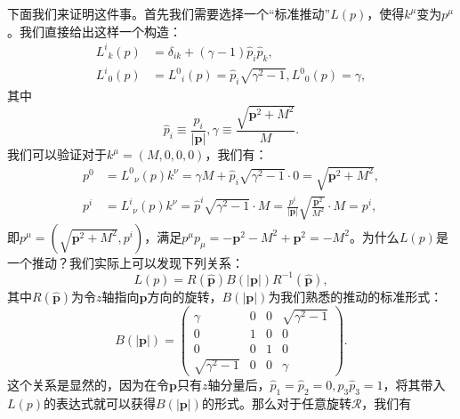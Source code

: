 下面我们来证明这件事。首先我们需要选择一个“标准推动”$ L( p)$，使得$ k^{\mu }$变为$ p^{\mu }$。我们直接给出这样一个构造：
\begin{equation}
	\begin{aligned}
		L^{i}{}_{k}( p) & =\delta _{ik} +( \gamma -1)\hat{p}_{i}\hat{p}_{k} ,\\
		L^{i}{}_{0}( p) & =L^{0}{}_{i}( p) =\hat{p}_{i}\sqrt{\gamma ^{2} -1} ,L^{0}{}_{0}( p) =\gamma ,
		\label{eq:standard_boost}
	\end{aligned}
\end{equation}
其中
\begin{equation*}
	\hat{p}_{i} \equiv \frac{p_{i}}{| \boldsymbol{p}| } ,\gamma \equiv \frac{\sqrt{\boldsymbol{p}^{2} +M^{2}}}{M} .
\end{equation*}
我们可以验证对于$ k^{\mu } =( M,0,0,0)$，我们有：
\begin{equation*}
	\begin{aligned}
		p^{0} & =L^{0}{}_{\nu }( p) k^{\nu } =\gamma M+\hat{p}_{i}\sqrt{\gamma ^{2} -1} \cdot 0=\sqrt{\boldsymbol{p}^{2} +M^{2}} ,\\
		p^{i} & =L^{i}{}_{\nu }( p) k^{\nu } =\hat{p}^{i}\sqrt{\gamma ^{2} -1} \cdot M=\frac{p^{i}}{| \boldsymbol{p}| }\sqrt{\frac{\boldsymbol{p}^{2}}{M^{2}}} \cdot M=p^{i} ,
	\end{aligned}
\end{equation*}
即$ p^{\mu } =(\sqrt{\boldsymbol{p}^{2} +M^{2}} ,p^{i} )$，满足$ p^{\mu } p_{\mu } =-\boldsymbol{p}^{2} -M^{2} +\boldsymbol{p}^{2} =-M^{2}$。为什么$ L( p)$是一个推动？我们实际上可以发现下列关系：
\begin{equation}
	L( p) =R(\hat{\boldsymbol{p}}) B(| \boldsymbol{p}| ) R^{-1}(\hat{\boldsymbol{p}}) ,
	\label{eq:massiveLp}
\end{equation}
其中$ R(\hat{\boldsymbol{p}})$为令$ z$轴指向$ \boldsymbol{p}$方向的旋转，$ B(| \boldsymbol{p}| )$为我们熟悉的推动的标准形式：
\begin{equation*}
	B(| \boldsymbol{p}| ) =\begin{pmatrix}
		\gamma  & 0 & 0 & \sqrt{\gamma ^{2} -1}\\
		0 & 1 & 0 & 0\\
		0 & 0 & 1 & 0\\
		\sqrt{\gamma ^{2} -1} & 0 & 0 & \gamma 
	\end{pmatrix} .
\end{equation*}
这个关系是显然的，因为在令$\boldsymbol{p}$只有$z$轴分量后，$\hat{p}_{1} =\hat{p}_{2} =0,\hat{p}_{3}\hat{p}_{3} =1$，将其带入$L( p)$的表达式就可以获得$B(| \boldsymbol{p}| )$的形式。那么对于任意旋转$\mathcal{R}$，我们有
